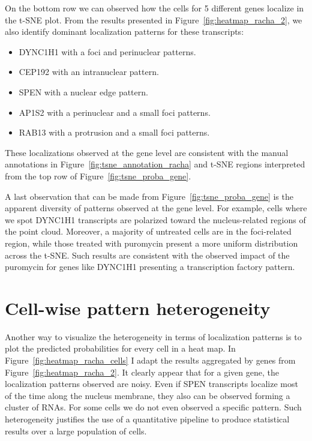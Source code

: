 On the bottom row we can observed how the cells for 5 different genes localize in the \ac{t-SNE} plot.
From the results presented in Figure~\ref{fig:heatmap_racha_2}, we also identify dominant localization patterns for these transcripts:
\begin{itemize}
	\setlength\itemsep{0.1em}
	\item DYNC1H1 with a foci and perinuclear patterns.
	\item CEP192 with an intranuclear pattern.
	\item SPEN with a nuclear edge pattern.
	\item AP1S2 with a perinuclear and a small foci patterns.
	\item RAB13 with a protrusion and a small foci patterns.
\end{itemize}

\noindent
These localizations observed at the gene level are consistent with the manual annotations in Figure~\ref{fig:tsne_annotation_racha} and \ac{t-SNE} regions interpreted from the top row of Figure~\ref{fig:tsne_proba_gene}.

A last observation that can be made from Figure~\ref{fig:tsne_proba_gene} is the apparent diversity of patterns observed at the gene level.
For example, cells where we spot DYNC1H1 transcripts are polarized toward the nucleus-related regions of the point cloud.
Moreover, a majority of untreated cells are in the foci-related region, while those treated with puromycin present a more uniform distribution across the \ac{t-SNE}.
Such results are consistent with the observed impact of the puromycin for genes like DYNC1H1 presenting a transcription factory pattern.

\section{Cell-wise pattern heterogeneity}
\label{sec:pattern_heterogeneity}

Another way to visualize the heterogeneity in terms of localization patterns is to plot the predicted probabilities for every cell in a heat map.
In Figure~\ref{fig:heatmap_racha_cells} I adapt the results aggregated by genes from Figure~\ref{fig:heatmap_racha_2}.
It clearly appear that for a given gene, the localization patterns observed are noisy.
Even if SPEN transcripts localize most of the time along the nucleus membrane, they also can be observed forming a cluster of \ac{RNA}s.
For some cells we do not even observed a specific pattern.
Such heterogeneity justifies the use of a quantitative pipeline to produce statistical results over a large population of cells.

